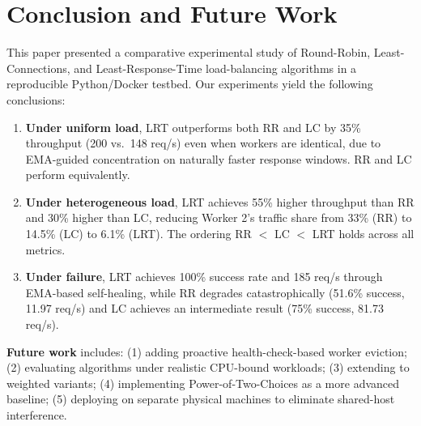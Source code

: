 \documentclass[conference]{IEEEtran}
\begin{document}
\section{Conclusion and Future Work}

This paper presented a comparative experimental study of Round-Robin, Least-Connections, and Least-Response-Time load-balancing algorithms in a reproducible Python/Docker testbed. Our experiments yield the following conclusions:

\begin{enumerate}
  \item \textbf{Under uniform load}, LRT outperforms both RR and LC by 35\% throughput (200 vs.\ 148 req/s) even when workers are identical, due to EMA-guided concentration on naturally faster response windows. RR and LC perform equivalently.
  \item \textbf{Under heterogeneous load}, LRT achieves 55\% higher throughput than RR and 30\% higher than LC, reducing Worker 2's traffic share from 33\% (RR) to 14.5\% (LC) to 6.1\% (LRT). The ordering RR $<$ LC $<$ LRT holds across all metrics.
  \item \textbf{Under failure}, LRT achieves 100\% success rate and 185 req/s through EMA-based self-healing, while RR degrades catastrophically (51.6\% success, 11.97 req/s) and LC achieves an intermediate result (75\% success, 81.73 req/s).
\end{enumerate}

\textbf{Future work} includes: (1) adding proactive health-check-based worker eviction; (2) evaluating algorithms under realistic CPU-bound workloads; (3) extending to weighted variants; (4) implementing Power-of-Two-Choices as a more advanced baseline; (5) deploying on separate physical machines to eliminate shared-host interference.
\end{document}

